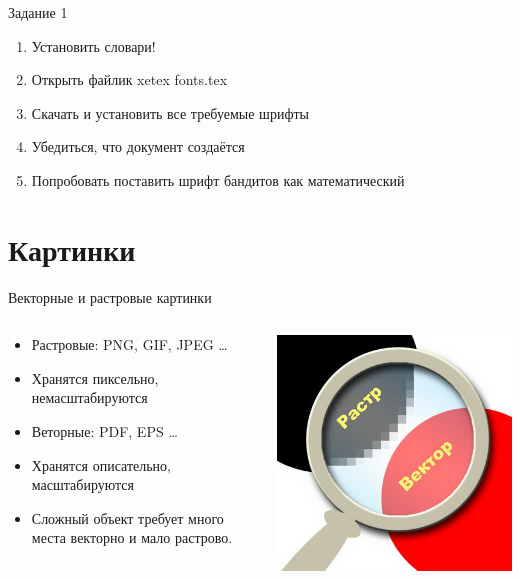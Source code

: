 \documentclass[aspectratio=169]{beamer} %
\begin{document}
\begin{frame}{Задание 1} 
\begin{enumerate}
	\item  Установить словари!
	\item  Открыть файлик  xetex fonts.tex 
	\item  Скачать и установить все требуемые шрифты
	\item  Убедиться, что документ создаётся
	\item  Попробовать поставить шрифт бандитов как математический  
\end{enumerate}
\end{frame}


 
\section{Картинки} 

\begin{frame}{Векторные и растровые картинки} 
\begin{columns}
\begin{column}{.55\linewidth}
\begin{itemize}
\item Растровые: PNG, GIF, JPEG \ldots
\item Хранятся пиксельно, немасштабируются
\item Веторные: PDF, EPS \ldots
\item Хранятся описательно, масштабируются
\item Сложный объект требует много места векторно и мало растрово.
\end{itemize}
\end{column}
\begin{column}{.42\linewidth}
\includegraphics[width=0.99\linewidth]{rv.jpg}
\end{column}
\end{columns}
\end{frame}
\end{document}
